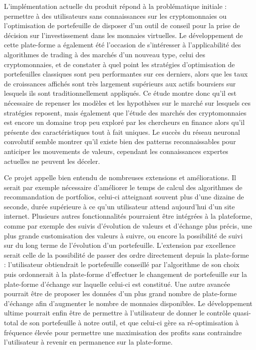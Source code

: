 \documentclass[a4paper, 10pt]{article}
\begin{document}
L'implémentation actuelle du produit répond à la problématique initiale : permettre à des utilisateurs sans connaissances sur les cryptomonnaies ou l'optimisation de portefeuille de disposer d'un outil de conseil pour la prise de décision sur l'investissement dans les monnaies virtuelles. Le développement de cette plate-forme a également été l'occasion de s'intéresser à l'applicabilité des algorithmes de trading à des marchés d'un nouveau type, celui des cryptomonnaies, et de constater à quel point les stratégies d'optimisation de portefeuilles classiques sont peu performantes sur ces derniers, alors que les taux de croissances affichés sont très largement supérieurs aux actifs boursiers sur lesquels ils sont traditionnellement appliqués. Ce étude montre donc qu'il est nécessaire de repenser les modèles et les hypothèses sur le marché sur lesquels ces stratégies reposent, mais également que l'étude des marchés des cryptomonnaies est encore un domaine trop peu exploré par les chercheurs en finance alors qu'il présente des caractéristiques tout à fait uniques. Le succès du réseau neuronal convolutif semble montrer qu'il existe bien des patterns reconnaissables pour anticiper les mouvements de valeurs, cependant les connaissances expertes actuelles ne peuvent les déceler.

Ce projet appelle bien entendu de nombreuses extensions et améliorations. Il serait par exemple nécessaire d'améliorer le temps de calcul des algorithmes de recommandation de portfolios, celui-ci atteignant souvent plus d'une dizaine de seconde, durée supérieure à ce qu'un utilisateur attend aujourd'hui d'un site internet. Plusieurs autres fonctionnalités pourraient être intégrées à la plateforme, comme par exemple des suivis d'évolution de valeurs et d'échange plus précis, une plus grande customisation des valeurs à suivre, ou encore la possibilité de suivi sur du long terme de l'évolution d'un portefeuille. L'extension par excellence serait celle de la possibilité de passer des ordre directement depuis la plate-forme : l'utilisateur obtiendrait le portefeuille conseillé par l'algorithme de son choix puis ordonnerait à la plate-forme d'effectuer le changement de portefeuille sur la plate-forme d'échange sur laquelle celui-ci est constitué. Une autre avancée pourrait être de proposer les données d'un plus grand nombre de plate-forme d'échange afin d'augmenter le nombre de monnaies disponibles. Le développement ultime pourrait enfin être de permettre à l'utilisateur de donner le contrôle quasi-total de son portefeuille à notre outil, et que celui-ci gère sa ré-optimisation à fréquence élevée pour permettre une maximisation des profits sans contraindre l'utilisateur à revenir en permanence sur la plate-forme.

\newpage
\printbibliography[heading=bibintoc]
\end{document}
